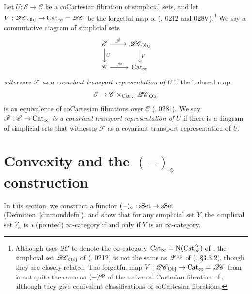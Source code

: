 \documentclass{tac}
\newcommand{\s}[1]{\mathscr{#1}}
\newcommand{\tx}[1]{\textnormal{#1}}
\begin{document}
\begin{definition}[\tx{}\cite{kerodon}, 028V] Let $U : \s{E} \to \s{C}$ be a coCartesian fibration of simplicial sets, and let $V : \s{{QC}}_{\tx{Obj}} \to \tx{Cat}_\infty = \s{{QC}}$ be the forgetful map of (\cite{kerodon}, 0212 and 028V).\footnote{Although \cite{kerodon} uses $\s{{QC}}$ to denote the $\infty$-category $\tx{Cat}_\infty = \tx{N}(\tx{Cat}_\infty^\Delta )$ of \cite{htt}, the simplicial set $\s{{QC}}_{\tx{Obj}}$ of (\cite{kerodon}, 0212) is not the same as $\s{Z}^\tx{op}$ of (\cite{htt}, \S 3.3.2), though they are closely related.  The forgetful map $V : \s{{QC}}_{\tx{Obj}} \to \tx{Cat}_\infty = \s{{QC}}$ from \cite{kerodon} is not quite the same as $(-)^\tx{op}$ of the universal Cartesian fibration of \cite{htt}, although they give equivalent classifications of coCartesian fibrations.}  We say a commutative diagram of simplicial sets
\[\begin{tikzcd}
\s{E} \arrow[]{r}{\tilde{\s{F}}} \arrow[]{d}{U} & \s{{QC}}_{\tx{Obj}} \arrow[]{d}{V} \\
\s{C} \arrow[]{r}{\s{F}} & \tx{Cat}_\infty
\end{tikzcd}\]
\emph{witnesses $\s{F}$ as a covariant transport representation of }$U$ if the induced map
\[ \s{E} \to \s{C}\times_{\tx{Cat}_\infty}  \s{{QC}}_{\tx{Obj}} \]
is an equivalence of coCartesian fibrations over $\s{C}$ (\cite{kerodon}, 0281).  We say $\s{F} : \s{C} \to \tx{Cat}_\infty$ \emph{is a covariant transport representation of }$U$ if there is a diagram of simplicial sets that witnesses $\s{F}$ as a covariant transport representation of $U$.
\end{definition}




\section{Convexity and the $(-)_\diamond$ construction}

In this section, we construct a functor $(-)_\diamond : \tx{sSet} \to \tx{sSet}$ (Definition~\ref{diamonddefn}), and show that for any simplicial set $Y$, the simplicial set $Y_\diamond$ is a (pointed) $\infty$-category if and only if $Y$ is an $\infty$-category.
\end{document}
